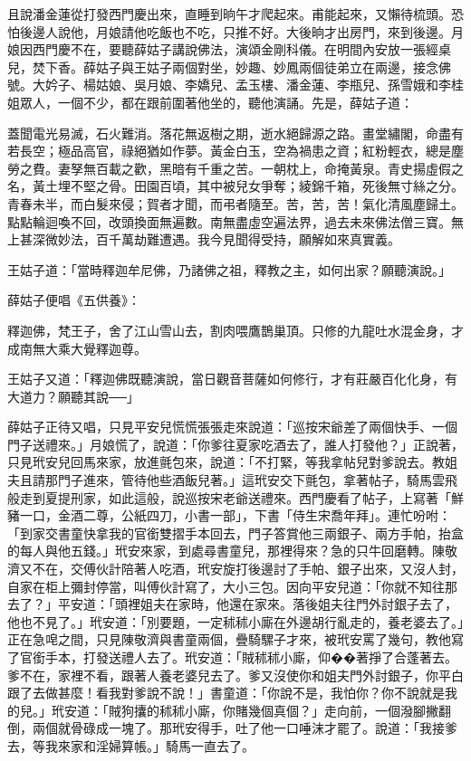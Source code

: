 且說潘金蓮從打發西門慶出來，直睡到晌午才爬起來。甫能起來，又懶待梳頭。恐怕後邊人說他，月娘請他吃飯也不吃，只推不好。大後晌才出房門，來到後邊。月娘因西門慶不在，要聽薛姑子講說佛法，演頌金剛科儀。在明間內安放一張經桌兒，焚下香。薛姑子與王姑子兩個對坐，妙趣、妙鳳兩個徒弟立在兩邊，接念佛號。大妗子、楊姑娘、吳月娘、李嬌兒、孟玉樓、潘金蓮、李瓶兒、孫雪娥和李桂姐眾人，一個不少，都在跟前圍著他坐的，聽他演誦。先是，薛姑子道：

蓋聞電光易滅，石火難消。落花無返樹之期，逝水絕歸源之路。畫堂繡閣，命盡有若長空；極品高官，祿絕猶如作夢。黃金白玉，空為禍患之資；紅粉輕衣，總是塵勞之費。妻孥無百載之歡，黑暗有千重之苦。一朝枕上，命掩黃泉。青史揚虛假之名，黃土埋不堅之骨。田園百頃，其中被兒女爭奪；綾錦千箱，死後無寸絲之分。青春未半，而白髮來侵；賀者才聞，而弔者隨至。苦，苦，苦！氣化清風塵歸土。點點輪迴喚不回，改頭換面無遍數。南無盡虛空遍法界，過去未來佛法僧三寶。無上甚深微妙法，百千萬劫難遭遇。我今見聞得受持，願解如來真實義。

王姑子道：「當時釋迦牟尼佛，乃諸佛之祖，釋教之主，如何出家？願聽演說。」

薛姑子便唱《五供養》：

釋迦佛，梵王子，舍了江山雪山去，割肉喂鷹鵲巢頂。只修的九龍吐水混金身，才成南無大乘大覺釋迦尊。

王姑子又道：「釋迦佛既聽演說，當日觀音菩薩如何修行，才有莊嚴百化化身，有大道力？願聽其說──」

薛姑子正待又唱，只見平安兒慌慌張張走來說道：「巡按宋爺差了兩個快手、一個門子送禮來。」月娘慌了，說道：「你爹往夏家吃酒去了，誰人打發他？」正說著，只見玳安兒回馬來家，放進氈包來，說道：「不打緊，等我拿帖兒對爹說去。教姐夫且請那門子進來，管待他些酒飯兒著。」這玳安交下氈包，拿著帖子，騎馬雲飛般走到夏提刑家，如此這般，說巡按宋老爺送禮來。西門慶看了帖子，上寫著「鮮豬一口，金酒二尊，公紙四刀，小書一部」，下書「侍生宋喬年拜」。連忙吩咐：「到家交書童快拿我的官銜雙摺手本回去，門子答賞他三兩銀子、兩方手帕，抬盒的每人與他五錢。」玳安來家，到處尋書童兒，那裡得來？急的只牛回磨轉。陳敬濟又不在，交傅伙計陪著人吃酒，玳安旋打後邊討了手帕、銀子出來，又沒人封，自家在柜上彌封停當，叫傅伙計寫了，大小三包。因向平安兒道：「你就不知往那去了？」平安道：「頭裡姐夫在家時，他還在家來。落後姐夫往門外討銀子去了，他也不見了。」玳安道：「別要題，一定秫秫小廝在外邊胡行亂走的，養老婆去了。」正在急唣之間，只見陳敬濟與書童兩個，疊騎騾子才來，被玳安罵了幾句，教他寫了官銜手本，打發送禮人去了。玳安道：「賊秫秫小廝，仰��著掙了合蓬著去。爹不在，家裡不看，跟著人養老婆兒去了。爹又沒使你和姐夫門外討銀子，你平白跟了去做甚麼！看我對爹說不說！」書童道：「你說不是，我怕你？你不說就是我的兒。」玳安道：「賊狗攮的秫秫小廝，你賭幾個真個？」走向前，一個潑腳撇翻倒，兩個就骨碌成一塊了。那玳安得手，吐了他一口唾沫才罷了。說道：「我接爹去，等我來家和淫婦算帳。」騎馬一直去了。


